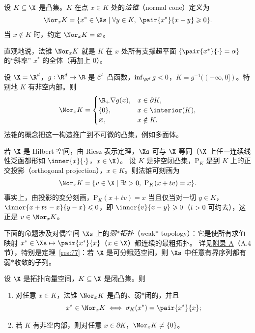 \begin{definition}[法锥]
\label{def:10}
设 $K\subseteq\X$ 是凸集。$K$ 在点 $x\in K$ 处的\emph{法锥}（normal cone）定义为
\[
  \Nor_xK=\{x^*\in\Xs\mid\forall y\in K,\ \pair{x^*}{x-y}\geqslant0\}.
\]
当 $x\notin K$ 时，约定 $\Nor_xK=\varnothing$。
\end{definition}

直观地说，法锥 $\Nor_xK$ 就是 $K$ 在 $x$ 处所有支撑超平面 $\{\pair{x^*}{\cdot}=\alpha\}$ 的“斜率” $x^*$ 的全体（再加上 $0$）。

\begin{example}[光滑下水平集]
\label{exa:3}
设 $\X=\R^d$，$g:\R^d\to\R$ 是 $\mathcal C^1$ 凸函数，$\inf_{\R^d}g<0$，$K=g^{-1}((-\infty,0])$。特别地 $K$ 有非空内部。则
\[
  \Nor_xK=\begin{cases}
    \R_+\nabla g(x), & x\in\partial K,\\
    \{0\}, & x\in\interior(K),\\
    \varnothing, & x\notin K.
  \end{cases}
\]
法锥的概念把这一构造推广到不可微的凸集，例如多面体。
\end{example}

\begin{example}
\label{exa:4}
若 $\X$ 是 Hilbert 空间，由 Riesz 表示定理，$\Xs$ 可与 $\X$ 等同（$\X$ 上任一连续线性泛函都形如 $\inner{x}{\cdot}$，$x\in\X$）。
设 $K$ 是非空闭凸集，$\mathrm P_K$ 是到 $K$ 上的正交投影（orthogonal projection），$x\in K$。则法锥可刻画为
\[
  \Nor_xK=\{v\in\X\mid\exists t>0,\ \mathrm P_K(x+tv)=x\}.
\]
事实上，由投影的变分刻画，$\mathrm P_K(x+tv)=x$ 当且仅当对一切 $y\in K$，$\inner{x+tv-x}{y-x}\leqslant0$，即 $\inner{v}{x-y}\geqslant0$（$t>0$ 可约去），这正是 $v\in\Nor_xK$。
\end{example}

下面的命题涉及对偶空间 $\Xs$ 上的\emph{弱$*$拓扑}（weak$*$ topology）：它是使所有求值映射 $x^*\in\Xs\mapsto\pair{x^*}{x}$（$x\in\X$）都连续的最粗拓扑。
详见\hyperref[ch:appA]{附录 A}（A.4 节），特别是定理~\ref{res:77}：若 $\X$ 是可分赋范空间，则 $\Xs$ 中任意有界序列都有弱$*$收敛的子列。

\begin{proposition}
\label{res:14}
设 $\X$ 是拓扑向量空间，$K\subseteq\X$ 是闭凸集。则
\begin{enumerate}[label=(\roman*)]
  \item 对任意 $x\in K$，法锥 $\Nor_xK$ 是凸的、弱$*$闭的，并且
  \[
    x^*\in\Nor_xK\iff\sigma_K(x^*)=\pair{x^*}{x};
  \]
  \item 若 $K$ 有非空内部，则对任意 $x\in\partial K$，$\Nor_xK\neq\{0\}$。
\end{enumerate}
\end{proposition}


